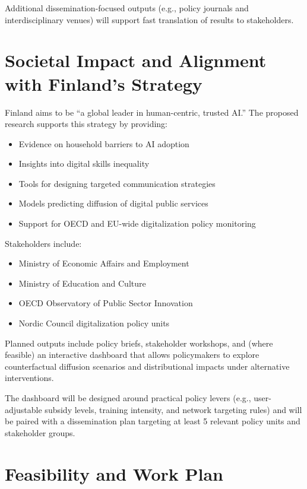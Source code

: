 \documentclass{nfr}
\begin{document}
Additional dissemination-focused outputs (e.g., policy journals and interdisciplinary venues) will support fast translation of results to stakeholders.

\section{Societal Impact and Alignment with Finland’s Strategy}

Finland aims to be “a global leader in human-centric, trusted AI.” The proposed research supports this strategy by providing:

\begin{itemize}
\item Evidence on household barriers to AI adoption
\item Insights into digital skills inequality
\item Tools for designing targeted communication strategies
\item Models predicting diffusion of digital public services
\item Support for OECD and EU-wide digitalization policy monitoring
\end{itemize}

Stakeholders include:

\begin{itemize}
\item Ministry of Economic Affairs and Employment
\item Ministry of Education and Culture
\item OECD Observatory of Public Sector Innovation
\item Nordic Council digitalization policy units
\end{itemize}

Planned outputs include policy briefs, stakeholder workshops, and (where feasible) an interactive dashboard that allows policymakers to explore counterfactual diffusion scenarios and distributional impacts under alternative interventions.

The dashboard will be designed around practical policy levers (e.g., user-adjustable subsidy levels, training intensity, and network targeting rules) and will be paired with a dissemination plan targeting at least 5 relevant policy units and stakeholder groups.

\section{Feasibility and Work Plan}
\end{document}
